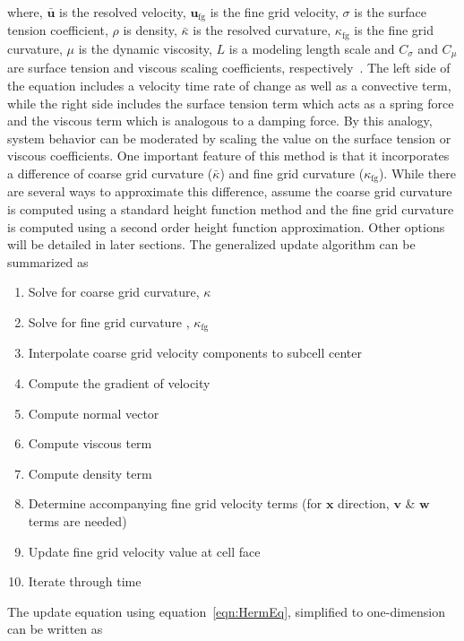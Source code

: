 \noindent where, $\bar{\bm{u}}$ is the resolved velocity,
$\bm{u}_{\text{fg}}$ is the fine grid velocity,
$\sigma$ is the surface tension coefficient,
$\rho$ is density, 
$\bar{\kappa}$ is the resolved curvature,
$\kappa_{\text{fg}}$ is the fine grid curvature,
$\mu$ is the dynamic viscosity,
$L$ is a modeling length scale and
$C_\sigma$ and
$C_\mu$ are surface tension and viscous scaling coefficients, respectively~\cite{Herrmann2013}. 
The left side of the equation includes a velocity time rate of change as well as a convective term, while the right side includes the surface tension term which acts as a spring force and the viscous term which is analogous to a damping force. By this analogy, system behavior can be moderated by scaling the value on the surface tension or viscous coefficients. One important feature of this method is that it incorporates a difference of coarse grid curvature ($\bar{\kappa}$) and fine grid curvature ($\kappa_{\text{fg}}$). While there are several ways to approximate this difference, assume the coarse grid curvature is computed using a standard height function method and the fine grid curvature is computed using a second order height function approximation. Other options will be detailed in later sections.
The generalized update algorithm can be summarized as 
\begin{enumerate}
	\item Solve for coarse grid curvature, $\kappa$
	\item Solve for fine grid curvature , $\kappa_{\text{fg}}$
	\item Interpolate coarse grid velocity components to subcell center
	\item Compute the gradient of velocity
	\item Compute normal vector 
	\item Compute viscous term 
	\item Compute density term
	\item Determine accompanying fine grid velocity terms (for $\bm{x}$ direction, $\bm{v}$ \& $\bm{w}$ terms are needed) 
	\item Update fine grid velocity value at cell face
	\item Iterate through time
\end{enumerate}

 The update equation using equation~\ref{eqn:HermEq}, simplified to one-dimension can be written as 

